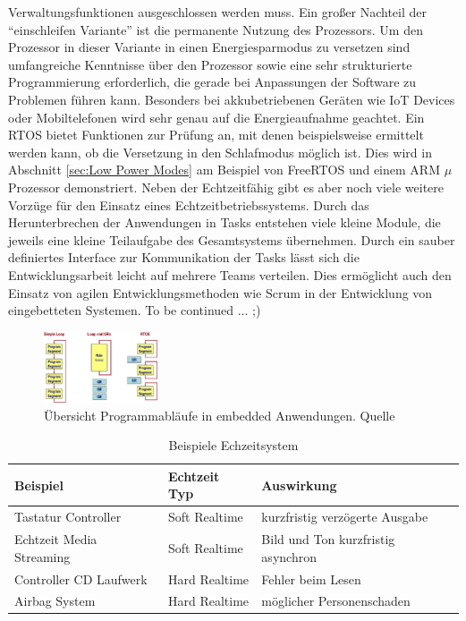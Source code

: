 Verwaltungsfunktionen ausgeschlossen werden muss. Ein großer Nachteil der "`einschleifen Variante"' ist die permanente Nutzung des Prozessors. Um den Prozessor in dieser Variante in einen Energiesparmodus zu versetzen sind umfangreiche Kenntnisse über den Prozessor sowie eine sehr strukturierte Programmierung erforderlich, die gerade bei Anpassungen der Software zu Problemen führen kann. Besonders bei akkubetriebenen Geräten wie IoT Devices oder Mobiltelefonen wird sehr genau auf die Energieaufnahme geachtet. Ein RTOS bietet Funktionen zur Prüfung an, mit denen beispielsweise ermittelt werden kann, ob die Versetzung in den Schlafmodus möglich ist. Dies wird in Abschnitt \ref{sec:Low Power Modes} am Beispiel von FreeRTOS und einem ARM $\mu$Prozessor demonstriert. Neben der Echtzeitfähig gibt es aber noch viele weitere Vorzüge für den Einsatz eines Echtzeitbetriebssystems.  
Durch das Herunterbrechen der Anwendungen in Tasks entstehen viele kleine Module, die jeweils eine kleine Teilaufgabe des Gesamtsystems übernehmen. Durch ein sauber definiertes Interface zur Kommunikation der Tasks lässt sich die Entwicklungsarbeit leicht auf mehrere Teams verteilen. Dies ermöglicht auch den Einsatz von agilen Entwicklungsmethoden wie Scrum in der Entwicklung von eingebetteten Systemen. 
To be continued ... ;)  
\newline  
\begin{figure}
	\centering
		\includegraphics[width=0.3\textwidth]{Pictures/EmbeddedCom/cwrtos2f5c.jpg}
	\caption{Übersicht Programmabläufe in embedded Anwendungen. Quelle~\protect{}}
	\label{fig:Programmablauf}
\end{figure}

\begin{table}
\centering
	\begin{tabular}{|l|l|l|}
		\hline
		\textbf{Beispiel} & \textbf{Echtzeit Typ}  & \textbf{Auswirkung} \\
		\hline
		Tastatur Controller & Soft Realtime & kurzfristig verzögerte Ausgabe \\
		\hline
		Echtzeit Media Streaming  & Soft Realtime & Bild und Ton kurzfristig asynchron \\
		\hline
		Controller CD Laufwerk  & Hard Realtime & Fehler beim Lesen\\ %
		\hline
		Airbag System  & Hard Realtime & möglicher Personenschaden\\
		\hline
	\end{tabular}
	\caption{Beispiele Echzeitsystem}
	\label{tab:BeispieleEchzeitsystem}
\end{table}




